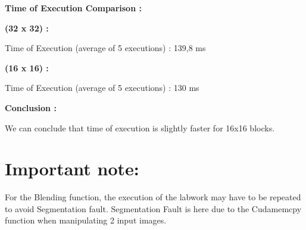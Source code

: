 \documentclass{article}
\begin{document}
\textbf{Time of Execution Comparison :}\newline

\textbf{(32 x 32) :}\newline

Time of Execution (average of 5 executions) : 139,8 ms\newline 

\textbf{(16 x 16) :}\newline

Time of Execution (average of 5 executions) : 130 ms\newline

\textbf{Conclusion :}\newline

We can conclude that time of execution is slightly faster for 16x16 blocks.\newline


\section{Important note:}

For the Blending function, the execution of the labwork may have to be repeated to avoid Segmentation fault. Segmentation Fault is here due to the Cudamemcpy function when manipulating 2 input images.
\end{document}
